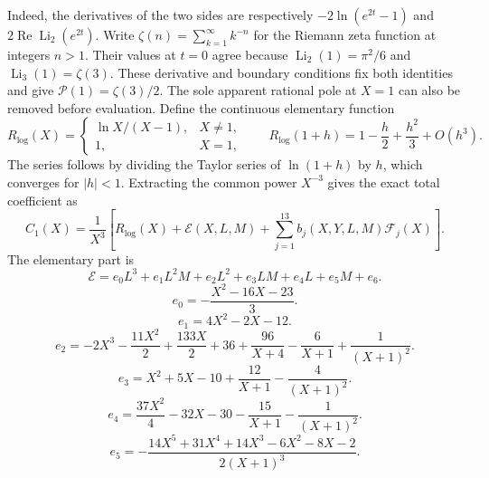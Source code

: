Indeed, the derivatives of the two sides are respectively $-2\ln(e^{2t}-1)$ and $2\operatorname{Re}\operatorname{Li}_2(e^{2t})$. Write $\zeta(n)=\sum_{k=1}^{\infty}k^{-n}$ for the Riemann zeta function at integers $n>1$. Their values at $t=0$ agree because $\operatorname{Li}_2(1)=\pi^2/6$ and $\operatorname{Li}_3(1)=\zeta(3)$. These derivative and boundary conditions fix both identities and give $\mathcal P(1)=\zeta(3)/2$.
The sole apparent rational pole at $X=1$ can also be removed before evaluation. Define the continuous elementary function
\begin{equation}
R_{\log}(X)=\begin{cases}\ln X/(X-1),&X\ne1,\\1,&X=1,\end{cases}\qquad R_{\log}(1+h)=1-\frac h2+\frac{h^2}{3}+O(h^3).
\end{equation}
The series follows by dividing the Taylor series of $\ln(1+h)$ by $h$, which converges for $|h|<1$. Extracting the common power $X^{-3}$ gives the exact total coefficient as
\begin{equation}
C_1(X)=\frac{1}{X^3}\left[R_{\log}(X)+\mathcal E(X,L,M)+\sum_{j=1}^{13}b_j(X,Y,L,M)\mathcal F_j(X)\right].
\label{\comptonproductlabel}\end{equation}
The elementary part is
\begin{equation}
\mathcal E=e_{0}L^{3}+e_{1}L^{2}M+e_{2}L^{2}+e_{3}LM+e_{4}L+e_{5}M+e_{6}.
\end{equation}
\begin{equation}
e_{0}=- \frac{X^{2} - 16 X - 23}{3}.
\end{equation}
\begin{equation}
e_{1}=4 X^{2} - 2 X - 12.
\end{equation}
\begin{equation}
e_{2}=- 2 X^{3} - \frac{11 X^{2}}{2} + \frac{133 X}{2} + 36 + \frac{96}{X + 4} - \frac{6}{X + 1} + \frac{1}{\left(X + 1\right)^{2}}.
\end{equation}
\begin{equation}
e_{3}=X^{2} + 5 X - 10 + \frac{12}{X + 1} - \frac{4}{\left(X + 1\right)^{2}}.
\end{equation}
\begin{equation}
e_{4}=\frac{37 X^{2}}{4} - 32 X - 30 - \frac{15}{X + 1} - \frac{1}{\left(X + 1\right)^{2}}.
\end{equation}
\begin{equation}
e_{5}=- \frac{14 X^{5} + 31 X^{4} + 14 X^{3} - 6 X^{2} - 8 X - 2}{2 \left(X + 1\right)^{3}}.
\end{equation}

